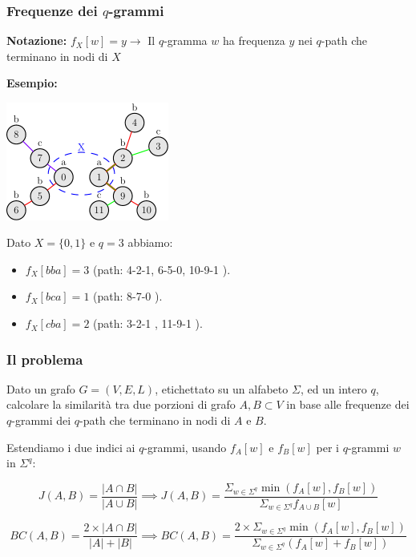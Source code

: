 
\begin{frame}
	\frametitle{Frequenze dei $q$-grammi}
	
	\textbf{Notazione:}  
	\small \center	
	$f_X[w] = y \rightarrow$ Il $q$-gramma $w$ ha frequenza $y$ nei $q$-path che terminano in nodi di $X$\medskip
	
	\pause
	
	\textbf{Esempio:}  
	
	\includegraphics[width=0.4\textwidth]{images/12_freq}
		
	Dato $X = \{0, 1\}$ e $q=3$ abbiamo:
	\centering
	\begin{itemize}
		\item $f_X[bba] = 3$ (path: \color{red}4-2-1\color{black}, \color{red}6-5-0\color{black}, \color{red}10-9-1 \color{black}).
		\item $f_X[bca] = 1$ (path: \color{RoyalPurple}8-7-0 \color{black}).
		\item $f_X[cba] = 2$ (path: \color{green}3-2-1 \color{black}, \color{green}11-9-1 \color{black}).
	\end{itemize}
\end{frame}

\begin{frame}
	\frametitle{Il problema}
	
	\begin{flushleft}
		Dato un grafo $G=(V,E,L)$, etichettato su un alfabeto $\Sigma$, ed un intero $q$,
		calcolare la similarità tra due porzioni di grafo $A, B \subset V$ in base alle frequenze
		dei $q$-grammi dei $q$-path che terminano in nodi di $A$ e $B$.
	\end{flushleft}

	\pause
	\small
	
			
	Estendiamo i due indici ai $q$-grammi, usando $f_A[w]$ e $f_B[w]$ per i $q$-grammi $w$ in $\Sigma^q$:

	\pause 
	\begin{equation*}\label{jaccard-sub}	
		J(A,B) = \frac{|A \cap B|}{|A \cup B|} \implies J(A,B) = \frac{ \Sigma_{w \in \Sigma^{q}} \min(f_{A}[w], f_{B}[w]) }{ \Sigma_{w \in \Sigma^{q}} f_{A \cup B}[w] }
	\end{equation*}

	\begin{equation*}\label{bray-sub}
		BC(A,B) = \frac{2 \times |A \cap B|}{|A| + |B|} \implies BC(A,B) = \frac{ 2 \times \Sigma_{w \in \Sigma^{q}} \min(f_{A}[w], f_{B}[w]) }{ \Sigma_{w \in \Sigma^{q}} (f_{A}[w] + f_{B}[w]) }
	\end{equation*}
	
\end{frame}

